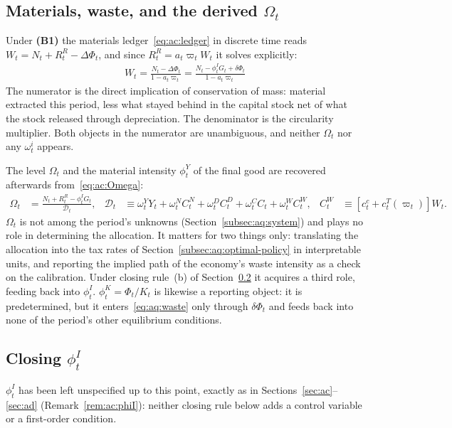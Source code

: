 \subsection{Materials, waste, and the derived $\Omega_t$}
\label{subsec:aq:materials}

Under \textbf{(B1)} the materials ledger~\eqref{eq:ac:ledger} in discrete time reads $W_t=N_t+R^R_t-\Delta\Phi_t$, and since $R^R_t=a_t\varpi_tW_t$ it solves explicitly:
\begin{align}
\boxed{\;W_t = \frac{N_t-\Delta\Phi_t}{1-a_t\varpi_t}
= \frac{N_t-\phi^I_tG_t+\delta\Phi_t}{1-a_t\varpi_t}\;}
\label{eq:aq:waste}
\end{align}
The numerator is the direct implication of conservation of mass: material extracted this period, less what stayed behind in the capital stock net of what the stock released through depreciation. The denominator is the circularity multiplier. Both objects in the numerator are unambiguous, and neither $\Omega_t$ nor any $\omega^i_t$ appears.

The level $\Omega_t$ and the material intensity $\phi^Y_t$ of the final good are recovered afterwards from~\eqref{eq:ac:Omega}:
\begin{align}
\Omega_t &= \frac{N_t+R^R_t-\phi^I_tG_t}{\mathcal D_t},
&
\mathcal D_t &\equiv \omega^Y_tY_t+\omega^N_tC^N_t+\omega^D_tC^D_t+\omega^C_tC_t+\omega^W_tC^W_t,
&
C^W_t &\equiv \left[c^c_t+c^T_t(\varpi_t)\right]W_t.
\label{eq:aq:Omega}
\end{align}
$\Omega_t$ is not among the period's unknowns (Section~\ref{subsec:aq:system}) and plays no role in determining the allocation. It matters for two things only: translating the allocation into the tax rates of Section~\ref{subsec:aq:optimal-policy} in interpretable units, and reporting the implied path of the economy's waste intensity as a check on the calibration. Under closing rule~(b) of Section~\ref{subsec:aq:phiI} it acquires a third role, feeding back into $\phi^I_t$. $\phi^K_t=\Phi_t/K_t$ is likewise a reporting object: it is predetermined, but it enters~\eqref{eq:aq:waste} only through $\delta\Phi_t$ and feeds back into none of the period's other equilibrium conditions.

\subsection{Closing $\phi^I_t$}
\label{subsec:aq:phiI}

$\phi^I_t$ has been left unspecified up to this point, exactly as in Sections~\ref{sec:ac}--\ref{sec:ad} (Remark~\ref{rem:ac:phiI}): neither closing rule below adds a control variable or a first-order condition.

